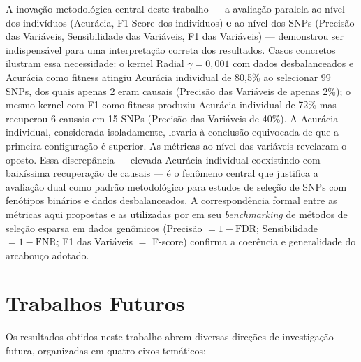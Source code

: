\documentclass[
    12pt,
    a4paper,
    oneside,
    english,
    french,
    spanish,
    brazil
    ]{abntex2}
\newcommand{\novo}[1]{\textcolor{corNova}{#1}}
\begin{document}
\novo{A inovação metodológica central deste trabalho --- a avaliação paralela ao nível dos indivíduos (Acurácia, F1 Score dos indivíduos) \textbf{e} ao nível dos SNPs (Precisão das Variáveis, Sensibilidade das Variáveis, F1 das Variáveis) --- demonstrou ser indispensável para uma interpretação correta dos resultados. Casos concretos ilustram essa necessidade: o kernel Radial $\gamma = 0{,}001$ com dados desbalanceados e Acurácia como fitness atingiu Acurácia individual de 80,5\% ao selecionar 99 SNPs, dos quais apenas 2 eram causais (Precisão das Variáveis de apenas 2\%); o mesmo kernel com F1 como fitness produziu Acurácia individual de 72\% mas recuperou 6 causais em 15 SNPs (Precisão das Variáveis de 40\%). A Acurácia individual, considerada isoladamente, levaria à conclusão equivocada de que a primeira configuração é superior. As métricas ao nível das variáveis revelaram o oposto. Essa discrepância --- elevada Acurácia individual coexistindo com baixíssima recuperação de causais --- é o fenômeno central que justifica a avaliação dual como padrão metodológico para estudos de seleção de SNPs com fenótipos binários e dados desbalanceados. A correspondência formal entre as métricas aqui propostas e as utilizadas por \citeonline{Kollipara2026} em seu \textit{benchmarking} de métodos de seleção esparsa em dados genômicos (Precisão $= 1 - \text{FDR}$; Sensibilidade $= 1 - \text{FNR}$; F1 das Variáveis $=$ F-score) confirma a coerência e generalidade do arcabouço adotado.}

\section*{Trabalhos Futuros}

\novo{Os resultados obtidos neste trabalho abrem diversas direções de investigação futura, organizadas em quatro eixos temáticos:}
\end{document}

